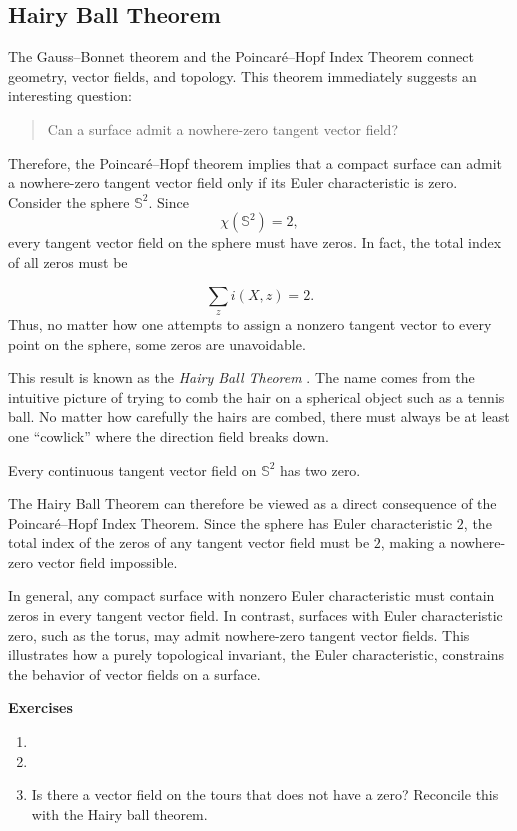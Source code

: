 \subsection{Hairy Ball Theorem}


The Gauss--Bonnet theorem and the Poincar\'e--Hopf Index Theorem connect geometry, vector fields, and topology. 
This theorem immediately suggests an interesting question:

\begin{quote}
Can a surface admit a nowhere-zero tangent vector field?
\end{quote}
Therefore, the Poincar\'e--Hopf theorem implies that a compact surface can
admit a nowhere-zero tangent vector field only if its Euler characteristic is
zero.
Consider the sphere $\mathbb{S}^2$. Since
$$
\chi(\mathbb{S}^2)=2,
$$
every tangent vector field on the sphere must have zeros. In fact, the total
index of all zeros must be

$$
\sum_z i(X,z)=2.
$$
Thus, no matter how one attempts to assign a nonzero tangent vector to every
point on the sphere, some zeros are unavoidable.

This result is known as the \emph{Hairy Ball Theorem} \cite{rotskoff2010}. The name comes from the
intuitive picture of trying to comb the hair on a spherical object such as a
tennis ball. No matter how carefully the hairs are combed, there must always
be at least one ``cowlick''  where the direction field breaks down.

\begin{theorem}
Every continuous tangent vector field on $\mathbb{S}^2$ has two zero.
\end{theorem}

The Hairy Ball Theorem can therefore be viewed as a direct consequence of the
Poincar\'e--Hopf Index Theorem. Since the sphere has Euler characteristic $2$,
the total index of the zeros of any tangent vector field must be $2$, making a
nowhere-zero vector field impossible.

In general, any compact surface with nonzero Euler characteristic must
contain zeros in every tangent vector field. In contrast, surfaces with Euler
characteristic zero, such as the torus, may admit nowhere-zero tangent vector
fields. This illustrates how a purely topological invariant, the Euler
characteristic, constrains the behavior of vector fields on a surface.



\noindent \textbf{Exercises}


\begin{enumerate}
	\item 
	
	\item 
	
	\item Is there a vector field on the tours that does not have a zero? Reconcile this with
	the Hairy ball theorem.
	
\end{enumerate}

\pagebreak
